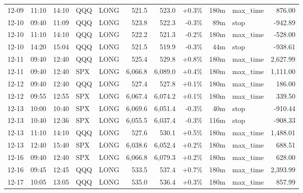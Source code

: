 \documentclass[11pt,a4paper,twoside]{article}
\begin{document}
\begin{center}
\begin{longtable}{>{\color{txtmain}}l l l l l r r r r >{\color{txtmain}}l r}
12-09 & 11:10 & 14:10 & QQQ & LONG & 521.5 & 523.0 & \textcolor{wingreen}{+0.3\%} & 180m & max\_time & \textcolor{wingreen}{876.00} \\
12-10 & 09:40 & 11:09 & QQQ & LONG & 523.8 & 522.3 & \textcolor{lossred}{-0.3\%} & 89m & stop & \textcolor{lossred}{-942.89} \\
12-10 & 11:10 & 14:10 & QQQ & LONG & 522.2 & 521.3 & \textcolor{lossred}{-0.2\%} & 180m & max\_time & \textcolor{lossred}{-528.00} \\
12-10 & 14:20 & 15:04 & QQQ & LONG & 521.5 & 519.9 & \textcolor{lossred}{-0.3\%} & 44m & stop & \textcolor{lossred}{-938.61} \\
12-11 & 09:40 & 12:40 & QQQ & LONG & 525.4 & 529.8 & \textcolor{wingreen}{+0.8\%} & 180m & max\_time & \textcolor{wingreen}{2,627.99} \\
12-11 & 09:40 & 12:40 & SPX & LONG & 6,066.8 & 6,089.0 & \textcolor{wingreen}{+0.4\%} & 180m & max\_time & \textcolor{wingreen}{1,111.00} \\
12-12 & 09:40 & 12:40 & QQQ & LONG & 527.4 & 527.8 & \textcolor{wingreen}{+0.1\%} & 180m & max\_time & \textcolor{wingreen}{186.00} \\
12-12 & 09:55 & 12:55 & SPX & LONG & 6,067.4 & 6,074.2 & \textcolor{wingreen}{+0.1\%} & 180m & max\_time & \textcolor{wingreen}{339.50} \\
12-13 & 10:00 & 10:40 & SPX & LONG & 6,069.6 & 6,051.4 & \textcolor{lossred}{-0.3\%} & 40m & stop & \textcolor{lossred}{-910.44} \\
12-13 & 10:40 & 12:36 & SPX & LONG & 6,055.5 & 6,037.4 & \textcolor{lossred}{-0.3\%} & 116m & stop & \textcolor{lossred}{-908.33} \\
12-13 & 11:10 & 14:10 & QQQ & LONG & 527.6 & 530.1 & \textcolor{wingreen}{+0.5\%} & 180m & max\_time & \textcolor{wingreen}{1,488.01} \\
12-13 & 12:40 & 15:40 & SPX & LONG & 6,038.6 & 6,052.4 & \textcolor{wingreen}{+0.2\%} & 180m & max\_time & \textcolor{wingreen}{688.51} \\
12-16 & 09:40 & 12:40 & SPX & LONG & 6,066.8 & 6,079.3 & \textcolor{wingreen}{+0.2\%} & 180m & max\_time & \textcolor{wingreen}{628.00} \\
12-16 & 09:45 & 12:45 & QQQ & LONG & 533.5 & 537.4 & \textcolor{wingreen}{+0.7\%} & 180m & max\_time & \textcolor{wingreen}{2,393.99} \\
12-17 & 10:05 & 13:05 & QQQ & LONG & 535.0 & 536.4 & \textcolor{wingreen}{+0.3\%} & 180m & max\_time & \textcolor{wingreen}{857.99} \\

\end{longtable}
\end{center}
\end{document}
